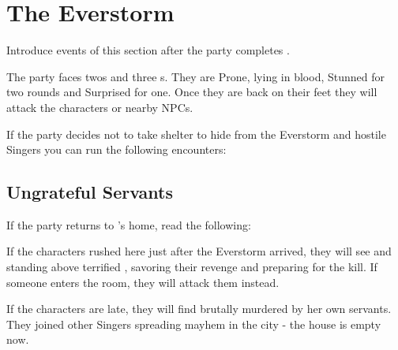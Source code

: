\section{The Everstorm}
\label{sec:enemyReborn}

Introduce events of this section after the party completes .


The party faces two\enemySingerWarform{}s and three \enemySingerNimbleform{}s. They are Prone, lying in blood, Stunned for two rounds and Surprised for one. Once they are back on their feet they will attack the characters or nearby NPCs.

If the party decides not to take shelter to hide from the Everstorm and hostile Singers you can run the following encounters:



\subsection{Ungrateful Servants}
\label{ssec:enemyRebornServants}

If the party returns to \npcGrandma{}'s home, read the following:


If the characters rushed here just after the Everstorm arrived, they will see \enemySingerWarform{} and \enemySingerNimbleform{} standing above terrified \npcGrandma{}, savoring their revenge and preparing for the kill. If someone enters the room, they will attack them instead.

If the characters are late, they will find \npcGrandma{} brutally murdered by her own servants. They joined other Singers spreading mayhem in the city - the house is empty now.


